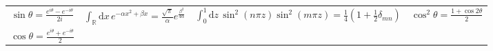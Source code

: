 \documentclass{article}
\newcommand{\ngrt}[2][]{
    \sqrt[\mathbf{-}#1]{#2}
}
\newcommand{\ket}[1]{
    \left| #1 \right\rangle
}
\newcommand{\bkprod}[2]{
    \left\langle #1 | #2 \right\rangle
}
\begin{document}
\begin{tabular}{*{5}{c}}
    \multicolumn{1}{c|}{$\sin\theta = \frac{e^{i\theta}-e^{-i\theta}}{2i} $} & \multicolumn{1}{c|}{$\int_\mathbb{R} \mathrm{d}x\, e^{-\alpha x^2 + \beta x} = \frac{\sqrt{\pi}}{\alpha}e^{\frac{\beta^2}{4\alpha}} $} & \multicolumn{2}{c|}{$\int_0^1 \mathrm{d}z\, \sin^2(n\pi z)\sin^2(m\pi z) = \frac{1}{4}\left(1+\frac{1}{2}\delta_{mn}\right) $} & $\cos^2 \theta = \frac{1+\cos 2\theta}{2} $ \\
    \cline{2-5}
    \multicolumn{1}{c|}{$\cos\theta = \frac{e^{i\theta}+e^{-i\theta}}{2} $} \\
    \cline{1-1}
\end{tabular}




\end{document}
